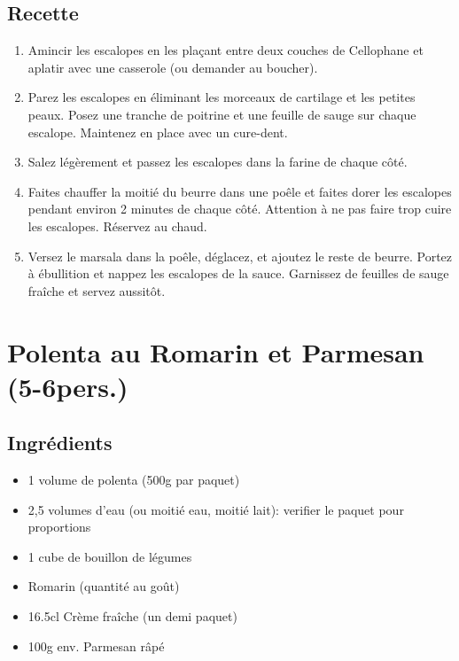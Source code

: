 \subsection{Recette}\label{recette-6}

\begin{enumerate}
\def\labelenumi{\arabic{enumi}.}

\item
  Amincir les escalopes en les plaçant entre deux couches de Cellophane
  et aplatir avec une casserole (ou demander au boucher).
\item
  Parez les escalopes en éliminant les morceaux de cartilage et les
  petites peaux. Posez une tranche de poitrine et une feuille de sauge
  sur chaque escalope. Maintenez en place avec un cure-dent.
\item
  Salez légèrement et passez les escalopes dans la farine de chaque
  côté.
\item
  Faites chauffer la moitié du beurre dans une poêle et faites dorer les
  escalopes pendant environ 2 minutes de chaque côté. Attention à ne pas
  faire trop cuire les escalopes. Réservez au chaud.
\item
  Versez le marsala dans la poêle, déglacez, et ajoutez le reste de
  beurre. Portez à ébullition et nappez les escalopes de la sauce.
  Garnissez de feuilles de sauge fraîche et servez aussitôt.
\end{enumerate}

\section{Polenta au Romarin et Parmesan
(5-6pers.)}\label{polenta-au-romarin-et-parmesan-5-6pers.}

\subsection{Ingrédients}\label{ingruxe9dients-9}

\begin{itemize}

\item
  1 volume de polenta (500g par paquet)
\item
  2,5 volumes d'eau (ou moitié eau, moitié lait): verifier le paquet
  pour proportions
\item
  1 cube de bouillon de légumes
\item
  Romarin (quantité au goût)
\item
  16.5cl Crème fraîche (un demi paquet)
\item
  100g env. Parmesan râpé
\end{itemize}


